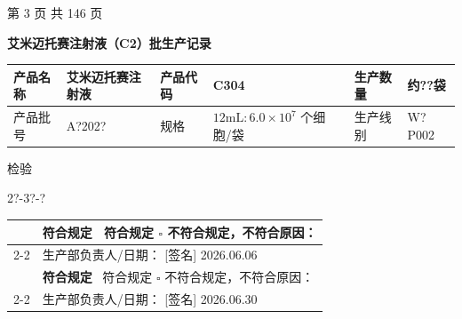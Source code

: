 \documentclass[UTF8,10pt,a4paper,fontset=fandol]{ctexart}
\newcommand{\fieldvalue}[1]{#1}
\newcommand{\handwritten}[1]{#1}
\begin{document}
\vfill
\begin{center}
第 3 页 共 146 页
\end{center}

\newpage

\begin{center}
{\large \textbf{艾米迈托赛注射液（C2）批生产记录}}
\end{center}

\noindent
\begin{tabularx}{\textwidth}{|l|X|l|X|l|X|}
\hline
产品名称 & 艾米迈托赛注射液 & 产品代码 & C304 & 生产数量 &
\fieldvalue{\handwritten{约??袋}} \\
\hline
产品批号 &
\fieldvalue{\handwritten{A?202?}} &
规格 & $12\mathrm{mL}: 6.0\times10^{7}$ 个细胞/袋 & 生产线别 &
\fieldvalue{\handwritten{W?P002}} \\
\hline
\end{tabularx}

\handwritten{检验}

\handwritten{2?-3?-?}

\vspace{0.5em}

\noindent
\begin{tabularx}{\textwidth}{|c|X|}
\hline
&
\textbf{符合规定}\quad
\fieldvalue{\handwritten{\checkmark\ 符合规定}}
\quad
$\square$ 不符合规定，不符合原因： \\
\cline{2-2}
&
生产部负责人/日期：
\fieldvalue{\handwritten{[签名]}}
\quad
\fieldvalue{\handwritten{2026.06.06}} \\
\hline
&
\textbf{符合规定}\quad
\fieldvalue{\handwritten{\checkmark\ 符合规定}}
\quad
$\square$ 不符合规定，不符合原因： \\
\cline{2-2}
&
生产部负责人/日期：
\fieldvalue{\handwritten{[签名]}}
\quad
\fieldvalue{\handwritten{2026.06.30}} \\
\hline
\end{tabularx}
\end{document}
